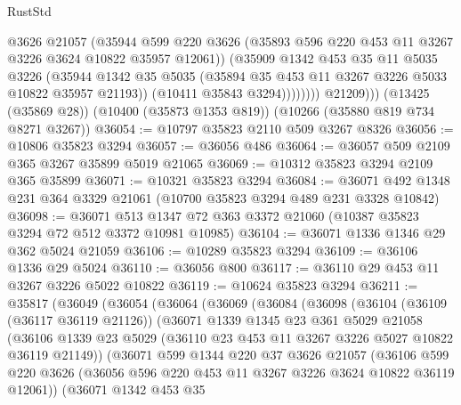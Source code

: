 \begin{lexlean}{RustStd}
\begin{coremodule}
                      @3626
                      @21057
                      (@35944
                        @599
                        @220
                        @3626
                        (@35893 @596 @220 @453 @11 @3267 @3226 @3624 @10822 @35957 @12061))
                      (@35909
                        @1342
                        @453
                        @35
                        @11
                        @5035
                        @3226
                        (@35944
                          @1342
                          @35
                          @5035
                          (@35894 @35 @453 @11 @3267 @3226 @5033 @10822 @35957 @21193))
                        (@10411 @35843 @3294))))))))
          @21209)))
    (@13425 (@35869 @28))
    (@10400 (@35873 @1353 @819))
    (@10266 (@35880 @819 @734 @8271 @3267))
@36054 := @10797 @35823 @2110 @509 @3267 @8326
@36056 := @10806 @35823 @3294
@36057 := @36056 @486
@36064 := @36057 @509 @2109 @365 @3267 @35899 @5019 @21065
@36069 := @10312 @35823 @3294 @2109 @365 @35899
@36071 := @10321 @35823 @3294
@36084 := @36071 @492 @1348 @231 @364 @3329 @21061 (@10700 @35823 @3294 @489 @231 @3328 @10842)
@36098 := @36071 @513 @1347 @72 @363 @3372 @21060 (@10387 @35823 @3294 @72 @512 @3372 @10981 @10985)
@36104 := @36071 @1336 @1346 @29 @362 @5024 @21059
@36106 := @10289 @35823 @3294
@36109 := @36106 @1336 @29 @5024
@36110 := @36056 @800
@36117 := @36110 @29 @453 @11 @3267 @3226 @5022 @10822
@36119 := @10624 @35823 @3294
@36211 := @35817
    (@36049
      (@36054
        (@36064
          (@36069
            (@36084
              (@36098
                (@36104
                  (@36109 (@36117 @36119 @21126))
                  (@36071
                    @1339
                    @1345
                    @23
                    @361
                    @5029
                    @21058
                    (@36106
                      @1339
                      @23
                      @5029
                      (@36110 @23 @453 @11 @3267 @3226 @5027 @10822 @36119 @21149))
                    (@36071
                      @599
                      @1344
                      @220
                      @37
                      @3626
                      @21057
                      (@36106
                        @599
                        @220
                        @3626
                        (@36056 @596 @220 @453 @11 @3267 @3226 @3624 @10822 @36119 @12061))
                      (@36071
                        @1342
                        @453
                        @35

\end{coremodule}
\end{lexlean}
